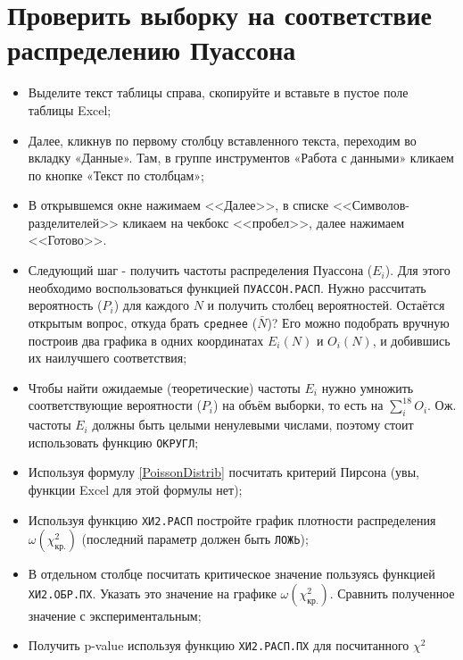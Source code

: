 \documentclass[14pt,a4paper]{article}
\begin{document}

\progress{}

\noindent\begin{minipage}{.85\textwidth}
\section{Проверить выборку на соответствие распределению Пуассона}
\noindent\begin{itemize}
	\item Выделите текст таблицы справа, скопируйте и вставьте в пустое поле таблицы Excel;
	\item Далее, кликнув по первому столбцу вставленного текста, переходим во вкладку «Данные». Там, в группе инструментов «Работа с данными» кликаем по кнопке «Текст по столбцам»; 
	\item В открывшемся окне нажимаем <<Далее>>, в списке <<Символов-разделителей>> кликаем на чекбокс <<пробел>>, далее нажимаем <<Готово>>.
	\item Следующий шаг - получить частоты распределения  Пуассона ($E_i$). Для этого необходимо воспользоваться функцией \texttt{ПУАССОН.РАСП}. Нужно рассчитать вероятность ($P_i$) для каждого $N$ и получить столбец вероятностей. Остаётся открытым вопрос, откуда брать \verb=среднее= ($\bar{N}$)? Его можно подобрать вручную построив два графика в одних координатах  $E_i(N)$ и $O_i(N)$, и добившись их наилучшего соответствия;
\end{itemize}
\end{minipage}
\begin{minipage}{.1\textwidth}
\end{minipage}
\begin{itemize}
	\item Чтобы найти ожидаемые (теоретические) частоты $E_i$ нужно умножить соответствующие вероятности ($P_i$) на объём выборки, то есть на $\sum\limits_i^{18} O_i$. Ож. частоты $E_i$ должны быть целыми ненулевыми числами, поэтому стоит использовать функцию \texttt{ОКРУГЛ};
	\item Используя формулу \ref{PoissonDistrib} посчитать критерий Пирсона (увы, функции Excel для этой формулы нет);
	\item Используя функцию \texttt{ХИ2.РАСП} постройте график плотности распределения $\omega(\chi_\text{кр.}^2)$ (последний параметр должен быть \verb=ЛОЖЬ=);
	\item В отдельном столбце посчитать критическое значение пользуясь функцией \texttt{ХИ2.ОБР.ПХ}. Указать это значение на графике $\omega(\chi_\text{кр.}^2)$. Сравнить полученное значение с экспериментальным;
	\item Получить p-value используя функцию \texttt{ХИ2.РАСП.ПХ} для посчитанного $\chi^2$
\end{itemize}
\end{document}
